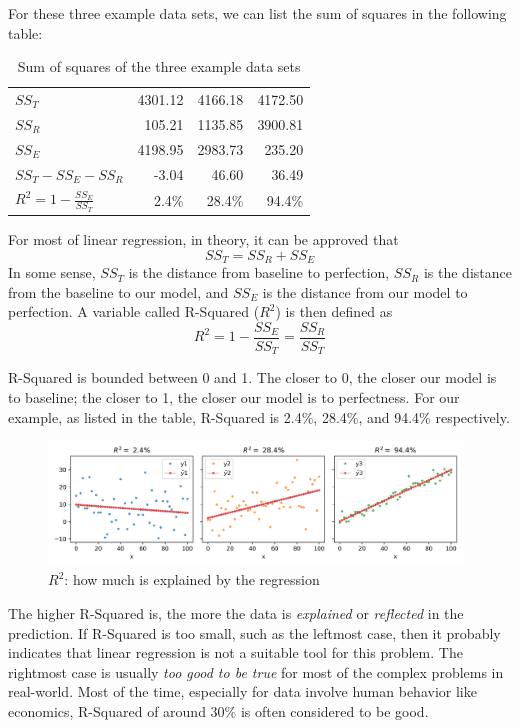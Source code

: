 \documentclass[
	letterpaper
]{article}
\begin{document}
For these three example data sets, we can list the sum of squares in the following table:
\begin{table}[htbp]
	\small 
	\centering 
		\caption{Sum of squares of the three example data sets}
		\label{table:ss}
	\begin{tabular}{l | r r r}
$SS_T$										&		4301.12	&		4166.18		&	  4172.50\\
$SS_R$										&   105.21	&		1135.85		&  3900.81\\
$SS_E$										&		4198.95	&		2983.73		&  235.20\\
$SS_T - SS_E - SS_R$		&		-3.04	& 	46.60		&  36.49\\
$R^2 = 1-\frac{SS_E}{SS_T}$			&		2.4\%	&		28.4\%		&  94.4\%\\
	\end{tabular}
 \end{table}

For most of linear regression, in theory, it can be approved that 
\begin{equation}
SS_T = SS_R + SS_E
\end{equation}
In some sense, $SS_T$ is the distance from baseline to perfection, $SS_R$ is the distance from the baseline to our model, and $SS_E$ is the distance from our model to perfection.
A variable called R-Squared ($R^2$) is then defined as 
\begin{equation}
R^2 = 1 - \frac{SS_E}{SS_T} = \frac{SS_R}{SS_T}
\end{equation}

R-Squared is bounded between 0 and 1. The closer to 0, the closer our model is to baseline; the closer to 1, the closer our model is to perfectness.
For our example, as listed in the table, R-Squared is 2.4\%, 28.4\%, and 94.4\% respectively.
\begin{figure}[htbp]
	\centering
	\includegraphics[width=0.98\textwidth]{figures/comparison-rsquared.png}
	\caption{$R^2$: how much is explained by the regression}
	\label{fig:rsquared}
\end{figure}

The higher R-Squared is, the more the data is \textit{explained} or \textit{reflected} in the prediction.
If R-Squared is too small, such as the leftmost case, then it probably indicates that linear regression is not a suitable tool for this problem.
The rightmost case is usually \textit{too good to be true} for most of the complex problems in real-world.
Most of the time, especially for data involve human behavior like economics, R-Squared of around 30\% is often considered to be good. 
\end{document}
